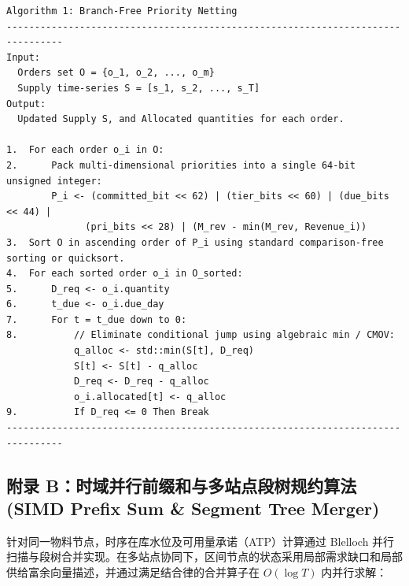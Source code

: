 \documentclass[11pt,a4paper]{article}
\begin{document}
\begin{verbatim}
Algorithm 1: Branch-Free Priority Netting
--------------------------------------------------------------------------------
Input: 
  Orders set O = {o_1, o_2, ..., o_m}
  Supply time-series S = [s_1, s_2, ..., s_T]
Output: 
  Updated Supply S, and Allocated quantities for each order.

1.  For each order o_i in O:
2.      Pack multi-dimensional priorities into a single 64-bit unsigned integer:
        P_i <- (committed_bit << 62) | (tier_bits << 60) | (due_bits << 44) | 
              (pri_bits << 28) | (M_rev - min(M_rev, Revenue_i))
3.  Sort O in ascending order of P_i using standard comparison-free sorting or quicksort.
4.  For each sorted order o_i in O_sorted:
5.      D_req <- o_i.quantity
6.      t_due <- o_i.due_day
7.      For t = t_due down to 0:
8.          // Eliminate conditional jump using algebraic min / CMOV:
            q_alloc <- std::min(S[t], D_req)
            S[t] <- S[t] - q_alloc
            D_req <- D_req - q_alloc
            o_i.allocated[t] <- q_alloc
9.          If D_req <= 0 Then Break
--------------------------------------------------------------------------------
\end{verbatim}

\subsection*{附录 B：时域并行前缀和与多站点段树规约算法 (SIMD Prefix Sum \& Segment Tree Merger)}

针对同一物料节点，时序在库水位及可用量承诺（ATP）计算通过 Blelloch 并行扫描与段树合并实现。在多站点协同下，区间节点的状态采用局部需求缺口和局部供给富余向量描述，并通过满足结合律的合并算子在 $O(\log T)$ 内并行求解：
\end{document}
